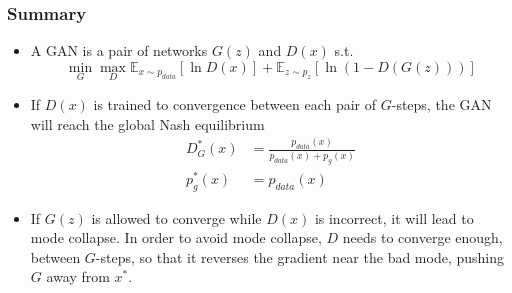 \documentclass{beamer}
\begin{document}
\begin{frame}
  \frametitle{Summary}
  \begin{itemize}
  \item A GAN is a pair of networks $G(z)$ and $D(x)$ s.t.
    \begin{displaymath}
      \min_G\max_D
      \mathbb{E}_{x\sim p_{data}}\left[\ln D(x)\right]
      +\mathbb{E}_{z\sim p_z}\left[\ln\left(1-D(G(z))\right)\right]
    \end{displaymath}
  \item If $D(x)$ is trained to convergence between each pair of
    $G$-steps, the GAN will reach the global Nash equilibrium
    \begin{align*}
      D^*_G(x) &= \frac{p_{data}(x)}{p_{data}(x)+p_g(x)}\\
      p^*_g(x) &= p_{data}(x)
    \end{align*}
  \item If $G(z)$ is allowed to converge while $D(x)$ is incorrect, it
    will lead to mode collapse.  In order to avoid mode collapse, $D$
    needs to converge enough, between $G$-steps, so that it reverses
    the gradient near the bad mode, pushing $G$ away from $x^*$.
  \end{itemize}
\end{frame}
\end{document}
